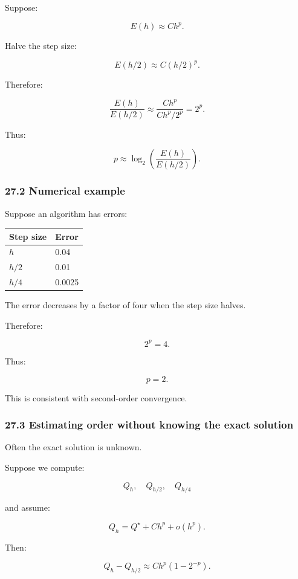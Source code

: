 Suppose:

\[ E(h)\approx Ch^p. \]

Halve the step size:

\[ E(h/2)\approx C(h/2)^p. \]

Therefore:

\[ \frac{E(h)}{E(h/2)} \approx \frac{Ch^p}{Ch^p/2^p} =2^p. \]

Thus:

\[ \boxed{ p\approx \log_2\left( \frac{E(h)}{E(h/2)} \right) }. \]

\subsubsection{27.2 Numerical example}\label{numerical-example}

Suppose an algorithm has errors:

{\def\LTcaptype{none} %
\begin{longtable}[]{@{}ll@{}}
\toprule\noalign{}
Step size & Error \\
\midrule\noalign{}
\endhead
\bottomrule\noalign{}
\endlastfoot
\(h\) & 0.04 \\
\(h/2\) & 0.01 \\
\(h/4\) & 0.0025 \\
\end{longtable}
}

The error decreases by a factor of four when the step size halves.

Therefore:

\[ 2^p=4. \]

Thus:

\[ \boxed{p=2}. \]

This is consistent with second-order convergence.

\subsubsection{27.3 Estimating order without knowing the exact solution}\label{estimating-order-without-knowing-the-exact-solution}

Often the exact solution is unknown.

Suppose we compute:

\[ Q_h,\quad Q_{h/2},\quad Q_{h/4} \]

and assume:

\[ Q_h=Q^\star+Ch^p+o(h^p). \]

Then:

\[ Q_h-Q_{h/2} \approx Ch^p(1-2^{-p}). \]

